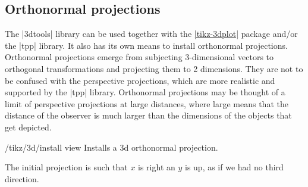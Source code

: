 \documentclass[a4paper,fleqn]{ltxdoc}
\begin{document}
\begin{codeexample}[width=4.5cm,preamble={\usetikzlibrary{3dtools}}]
\end{codeexample}

\subsection{Orthonormal projections}
\label{sec:3DOrthonormalProjections}

The |3dtools| library can be used together with the
\href{https://ctan.org/pkg/tikz-3dplot?lang=en}{|tikz-3dplot|} package and/or
the |tpp| library. It also has its own means to install orthonormal projections.
Orthonormal projections emerge from subjecting 3-dimensional vectors to
orthogonal transformations and projecting them to 2 dimensions. They are not to
be confused with the perspective projections, which are more realistic and
supported by the |tpp| library. Orthonormal projections may be thought of a
limit of perspective projections at large distances, where large means that the
distance of the observer is much larger than the dimensions of the objects that
get depicted. 

\begin{key}{/tikz/3d/install view}
        Installs a 3d orthonormal projection.
\end{key}

The initial projection is such that $x$ is right an $y$ is up, as if we had no
third direction.

\begin{codeexample}[width=2cm,preamble={\usetikzlibrary{3dtools}}]
\end{codeexample}
\end{document}
